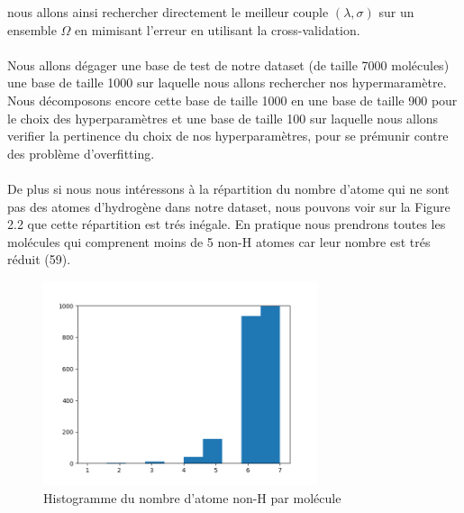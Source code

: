 \documentclass[a4paper,12pt,titlepage]{report}
\begin{document}
nous allons ainsi rechercher directement le meilleur couple $(\lambda, \sigma)$ sur un ensemble $\Omega$ en mimisant l'erreur en utilisant la cross-validation. 

\paragraph{}
Nous allons dégager une base de test de notre dataset (de taille 7000 molécules) une base de taille 1000 sur laquelle nous allons rechercher nos hypermaramètre.\\
Nous décomposons encore cette base de taille 1000 en une base de taille 900 pour le choix des hyperparamètres et une base de taille 100 sur laquelle nous allons verifier la pertinence du choix de nos hyperparamètres, pour se prémunir contre des problème d'overfitting.

\paragraph{} 
De plus si nous nous intéressons à la répartition du nombre d'atome qui ne sont pas des atomes d'hydrogène dans notre dataset, nous pouvons voir sur la Figure 2.2 que cette répartition est trés inégale. En pratique nous prendrons toutes les molécules qui comprenent moins de 5 non-H atomes car leur nombre est trés réduit (59).
\begin{figure}[!h]
\begin{center}
		\includegraphics[height = 6cm, keepaspectratio]{graphes/non_H_atom.png}
		\caption{Histogramme du nombre d'atome non-H par molécule}
		\end{center}
\end{figure}
\end{document}
